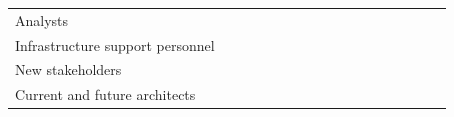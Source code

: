 \documentclass[11pt]{article}
\begin{document}
\begin{landscape}
\begin{center}
{\begin{tabular}{l|*{5}{c}|c|*{4}{c}|*{6}{c}}
Analysts                             &  &  &  &  &  &  &  &  &  &  &  &  &  &  &  &  \\
Infrastructure support personnel     &  &  &  &  &  &  &  &  &  &  &  &  &  &  &  &  \\
New stakeholders                     &  &  &  &  &  &  &  &  &  &  &  &  &  &  &  &  \\
Current and future architects        &  &  &  &  &  &  &  &  &  &  &  &  &  &  &  &  \\
\bottomrule
\end{tabular}%
}
\end{center}
\end{landscape}
\end{document}
